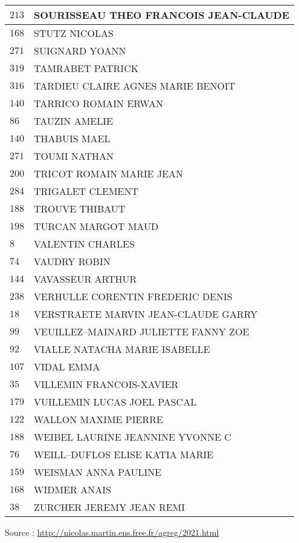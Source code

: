 \begin{xltabular}{\linewidth}{|l|X|}
    $213$ & SOURISSEAU THEO FRANCOIS JEAN-CLAUDE \\
    \hline
    $168$ & STUTZ NICOLAS \\
    \hline
    $271$ & SUIGNARD YOANN \\
    \hline
    $319$ & TAMRABET PATRICK \\
    \hline
    $316$ & TARDIEU CLAIRE AGNES MARIE BENOIT \\
    \hline
    $140$ & TARRICO ROMAIN ERWAN \\
    \hline
    $86$ & TAUZIN AMELIE \\
    \hline
    $140$ & THABUIS MAEL \\
    \hline
    $271$ & TOUMI NATHAN \\
    \hline
    $200$ & TRICOT ROMAIN MARIE JEAN \\
    \hline
    $284$ & TRIGALET CLEMENT \\
    \hline
    $188$ & TROUVE THIBAUT \\
    \hline
    $198$ & TURCAN MARGOT MAUD \\
    \hline
    $8$ & VALENTIN CHARLES \\
    \hline
    $74$ & VAUDRY ROBIN \\
    \hline
    $144$ & VAVASSEUR ARTHUR \\
    \hline
    $238$ & VERHULLE CORENTIN FREDERIC DENIS \\
    \hline
    $18$ & VERSTRAETE MARVIN JEAN-CLAUDE GARRY \\
    \hline
    $99$ & VEUILLEZ--MAINARD JULIETTE FANNY ZOE \\
    \hline
    $92$ & VIALLE NATACHA MARIE ISABELLE \\
    \hline
    $107$ & VIDAL EMMA \\
    \hline
    $35$ & VILLEMIN FRANCOIS-XAVIER \\
    \hline
    $179$ & VUILLEMIN LUCAS JOEL PASCAL \\
    \hline
    $122$ & WALLON MAXIME PIERRE \\
    \hline
    $188$ & WEIBEL LAURINE JEANNINE YVONNE C \\
    \hline
    $76$ & WEILL--DUFLOS ELISE KATIA MARIE \\
    \hline
    $159$ & WEISMAN ANNA PAULINE \\
    \hline
    $168$ & WIDMER ANAIS \\
    \hline
    $38$ & ZURCHER JEREMY JEAN REMI \\
    \hline
  \end{xltabular}

  \begin{flushright}
    {\tiny Source : \url{http://nicolas.martin.ens.free.fr/agreg/2021.html}}
  \end{flushright}


